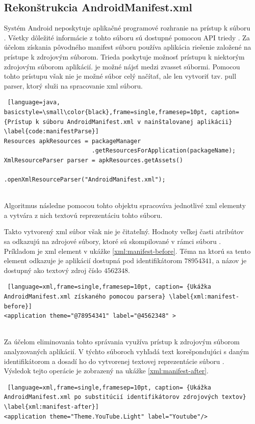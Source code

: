 \subsection{Rekonštrukcia AndroidManifest.xml}
Systém Android neposkytuje aplikačné programové rozhranie na prístup k súboru . Všetky dôležité informácie z tohto súboru sú dostupné pomocou API triedy . Za účelom získania pôvodného manifest súboru používa aplikácia  riešenie založené na prístupe k zdrojovým súborom. Trieda  poskytuje možnosť prístupu k niektorým zdrojovým súborom aplikácií.  je možné nájsť medzi 
zv{asset} súbormi. Pomocou tohto prístupu však nie je možné súbor celý načítať, ale len vytvoriť tzv. pull parser, ktorý služi na spracovanie xml súboru.\\ 
\begin{lstlisting} [language=java, basicstyle=\small\color{black},frame=single,framesep=10pt, caption= {Prístup k súboru AndroidManifest.xml v nainštalovanej aplikácii} \label{code:manifestParse}]
Resources apkResources = packageManager
                         .getResourcesForApplication(packageName);
XmlResourceParser parser = apkResources.getAssets()
                         .openXmlResourceParser("AndroidManifest.xml");
\end{lstlisting}
\mbox{}\\
\noindent Algoritmus následne pomocou tohto objektu spracováva jednotlivé xml elementy a vytvára z nich textovú reprezentáciu tohto súboru.


Takto vytvorený xml súbor však nie je čitateľný. Hodnoty veľkej časti atribútov sa odkazujú na zdrojové súbory, ktoré sú skompilované v rámci súboru . Príkladom je xml element  v ukážke \ref{xml:manifest-before}.  Téma na ktorú sa tento element odkazuje je aplikácií dostupná pod identifikátorom $78954341$, a názov je dostupný ako textový zdroj číslo $4562348$.
\mbox{}\\
\begin{lstlisting} [language=xml,frame=single,framesep=10pt, caption= {Ukážka AndroidManifest.xml získaného pomocou parsera} \label{xml:manifest-before}]
<application theme="@78954341" label="@4562348" >
\end{lstlisting}
\mbox{}\\
Za účelom eliminovania tohto správania využíva  prístup k zdrojovým súborom analyzovaných aplikácií. V týchto súboroch vyhľadá text korešpondujúci s daným identifikátorom a dosadí ho do vytvorenej textovej reprezentácie súboru . Výsledok tejto operácie je zobrazený na ukážke \ref{xml:manifest-after}.
\mbox{}\\
\begin{lstlisting} [language=xml,frame=single,framesep=10pt, caption= {Ukážka AndroidManifest.xml po substitúcií identifikátorov zdrojových textov} \label{xml:manifest-after}]
<application theme="Theme.YouTube.Light" label="Youtube"/>
\end{lstlisting}

